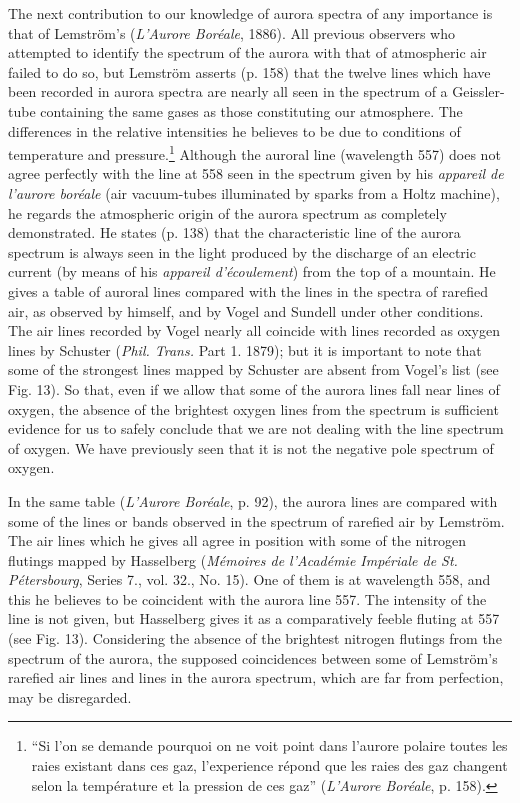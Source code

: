 \documentclass[a4paper, 12pt, oneside, polutonikogreek, english]{article}
\begin{document}
The next contribution to our knowledge of aurora spectra of any importance is that of Lemström's (\emph{L'Aurore Boréale}, 1886). All previous observers who attempted to identify the spectrum of the aurora with that of atmospheric air failed to do so, but Lemström asserts (p. 158) that the twelve lines which have been recorded in aurora spectra are nearly all seen in the spectrum of a Geissler-tube containing the same gases as those constituting our atmosphere. The differences in the relative intensities he believes to be due to conditions of temperature and pressure.\footnote{``Si l'on se demande pourquoi on ne voit point dans l'aurore polaire toutes les raies existant dans ces gaz, l'experience répond que les raies des gaz changent selon la température et la pression de ces gaz'' (\emph{L'Aurore Boréale}, p. 158).} Although the auroral line (wavelength 557) does not agree perfectly with the line at 558 seen in the spectrum given by his \emph{appareil de l'aurore boréale} (air vacuum-tubes illuminated by sparks from a Holtz machine), he regards the atmospheric origin of the aurora spectrum as completely demonstrated. He states (p. 138) that the characteristic line of the aurora spectrum is always seen in the light produced by the discharge of an electric current (by means of his \emph{appareil d'écoulement}) from the top of a mountain. He gives a table of auroral lines compared with the lines in the spectra of rarefied air, as observed by himself, and by Vogel and Sundell under other conditions. The air lines recorded by Vogel nearly all coincide with lines recorded as oxygen lines by Schuster (\emph{Phil. Trans.} Part 1. 1879); but it is important to note that some of the strongest lines mapped by Schuster are absent from Vogel's list (see Fig. 13). So that, even if we allow that some of the aurora lines fall near lines of oxygen, the absence of the brightest oxygen lines from the spectrum is sufficient evidence for us to safely conclude that we are not dealing with the line spectrum of oxygen. We have previously seen that it is not the negative pole spectrum of oxygen.

In the same table (\emph{L'Aurore Boréale}, p. 92), the aurora lines are compared with some of the lines or bands observed in the spectrum of rarefied air by Lemström. The air lines which he gives all agree in position with some of the nitrogen flutings mapped by Hasselberg (\emph{Mémoires de l'Académie Impériale de St. Pétersbourg}, Series 7., vol. 32., No. 15). One of them is at wavelength 558, and this he believes to be coincident with the aurora line 557. The intensity of the line is not given, but Hasselberg gives it as a comparatively feeble fluting at 557 (see Fig. 13). Considering the absence of the brightest nitrogen flutings from the spectrum of the aurora, the supposed coincidences between some of Lemström's rarefied air lines and lines in the aurora spectrum, which are far from perfection, may be disregarded.
\end{document}

